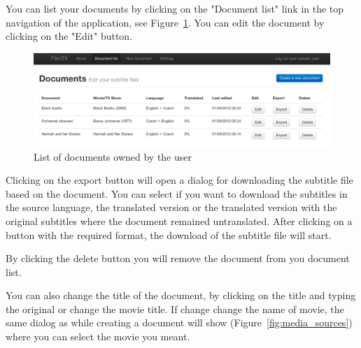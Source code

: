 You can list your documents by clicking on the "Document list" link in the top navigation of the application, see Figure~\ref{fig:document_list}. You can edit the document by clicking on the "Edit" button.

\begin{figure}[h]
\begin{center}
\includegraphics[scale=0.4]{figures/user_manual/list_of_documents.png}
\end{center}
\caption{List of documents owned by the user}
\label{fig:document_list}
\end{figure}

Clicking on the export button will open a dialog for downloading the subtitle file based on the document. You can select if you want to download the subtitles in the source language, the translated version or the translated version with the original subtitles where the document remained untranslated. After clicking on a button with the required format, the download of the subtitle file will start.

By clicking the delete button you will remove the document from you document list.

You can also change the title of the document, by clicking on the title and typing the original or change the movie title. If change change the name of movie, the same dialog as while creating a document will show (Figure~\ref{fig:media_sources}) where you can select the movie you meant.
